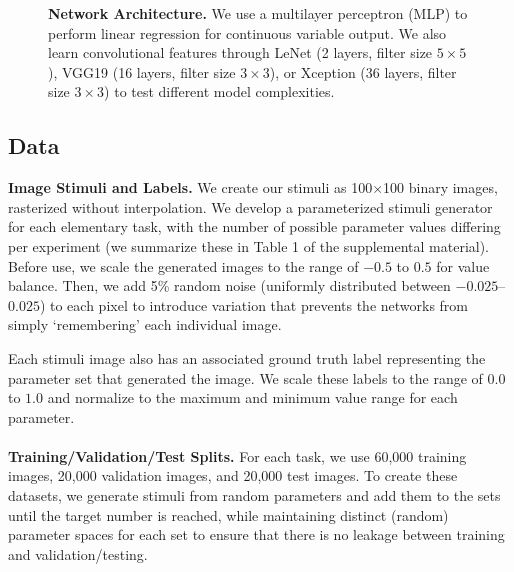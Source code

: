 \begin{figure}[t]
	\centering
	
	\hfill

  \caption{\textbf{Network Architecture.} We use a multilayer perceptron (MLP) to perform linear regression for continuous variable output. We also learn convolutional features through LeNet (2 layers, filter size $5\times5$), VGG19 (16 layers, filter size $3\times3$), or Xception (36 layers, filter size $3\times3$) to test different model complexities.}
  \label{fig:classifiers}
  \vspace{-0.5cm}
\end{figure}

\subsection{Data}
\label{sec:data}

\noindent\textbf{Image Stimuli and Labels.} 
We create our stimuli as 100$\times$100 binary images, rasterized without interpolation. We develop a parameterized stimuli generator for each elementary task, with the number of possible parameter values differing per experiment (we summarize these in Table 1 of the supplemental material). Before use, we scale the generated images to the range of $-0.5$ to $0.5$ for value balance. Then, we add 5\% random noise (uniformly distributed between $-0.025$--$0.025$) to each pixel to introduce variation that prevents the networks from simply `remembering' each individual image. 

Each stimuli image also has an associated ground truth label representing the parameter set that generated the image.
We scale these labels to the range of $0.0$ to $1.0$ and normalize to the maximum and minimum value range for each parameter.
\\~\\
\noindent\textbf{Training/Validation/Test Splits.} For each task, we use 60,000 training images, 20,000 validation images, and 20,000 test images. To create these datasets, we generate stimuli from random parameters and add them to the sets until the target number is reached, while maintaining distinct (random) parameter spaces for each set to ensure that there is no leakage between training and validation/testing.

